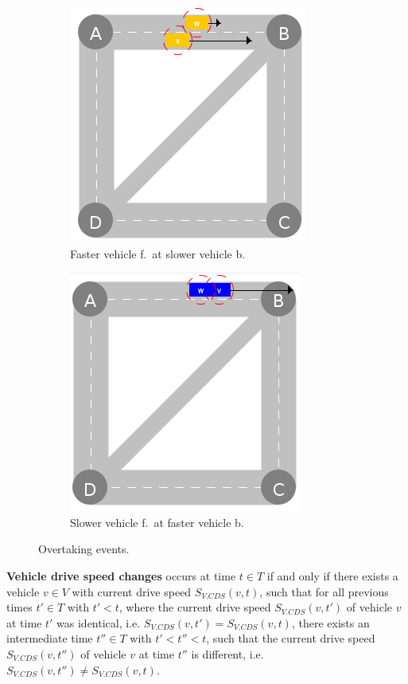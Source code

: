 \documentclass[graybox]{svmult}
\begin{document}
\begin{figure}
	\centering
	\begin{subfigure}{.45\textwidth}
	\centering
	\includegraphics[scale=0.35]{../../events/faster-vehicle-front-at-slower-vehicle-back.png}
	\caption{Faster vehicle f.\ at slower vehicle b.}
	\label{fig:faster-vehicle-front-at-slower-vehicle-back}
	\end{subfigure}
	\begin{subfigure}{.45\textwidth}
	\centering
	\includegraphics[scale=0.35]{../../events/slower-vehicle-front-at-faster-vehicle-back.png}
	\caption{Slower vehicle f.\ at faster vehicle b.}
	\label{fig:slower-vehicle-front-at-faster-vehicle-back}
	\end{subfigure}
	\caption{Overtaking events.}
	\label{fig:overtaking-events}
\end{figure}

\noindent
\textbf{Vehicle drive speed changes}
occurs at time $t \in T$ if and only if there exists a vehicle $v \in V$ with current drive speed $S_{V.CDS}(v, t)$, such that for all previous times $t' \in T$ with $t' < t$, where the current drive speed $S_{V.CDS}(v,t')$ of vehicle $v$ at time $t'$ was identical, i.e. $S_{V.CDS}(v,t') = S_{V.CDS}(v,t)$, there exists an intermediate time $t'' \in T$ with $t' < t'' < t$, such that the current drive speed $S_{V.CDS}(v,t'')$ of vehicle $v$ at time $t''$ is different, i.e. $S_{V.CDS}(v,t'') \neq S_{V.CDS}(v,t)$.
\vspace{4mm}
\end{document}
